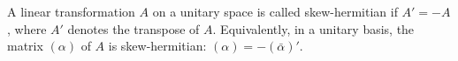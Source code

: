 A linear transformation $A$ on a unitary space is called skew-hermitian if $A' = -A$, where $A'$ denotes the transpose of $A$. Equivalently, in a unitary basis, the matrix $(\alpha)$ of $A$ is skew-hermitian: $(\alpha) = -(\bar{\alpha})'$.
